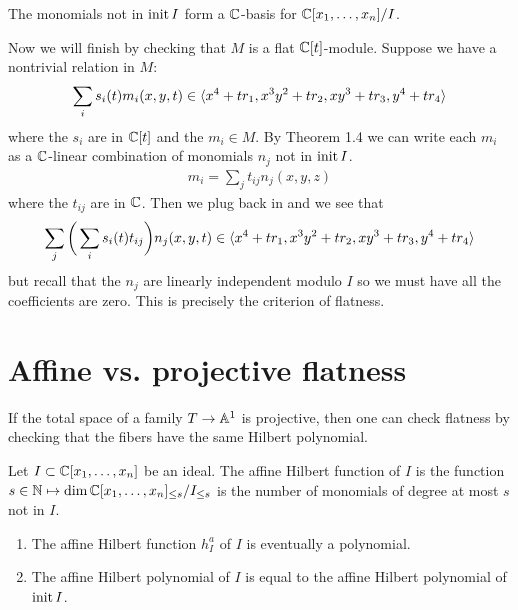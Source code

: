 \documentclass[12pt]{article}
\newcounter{problem}
\begin{document}

\begin{corollary}
	The monomials not in $\operatorname{init} I$ form a $\mathbb{C}$-basis for $\mathbb{C}[x_1,\dots,x_n]/I$.
\end{corollary}

Now we will finish by checking that $M$ is a flat $\mathbb{C}[t]$-module. Suppose we have a nontrivial
relation in $M$: \begin{align*}
	\sum_i s_i(t)m_i(x,y,t) \in \langle{x^4+tr_1,x^3y^2+tr_2,xy^3+tr_3,y^4+tr_4}\rangle
\end{align*} where the $s_i$ are in $\mathbb{C}[t]$ and the $m_i \in M$. By Theorem 1.4 we can
write each $m_i$ as a $\mathbb{C}$-linear combination of monomials $n_j$ not in $\operatorname{init} I$. \begin{align*}
	m_i = \sum_j t_{ij} n_j(x,y,z)
\end{align*} where the $t_{ij}$ are in $\mathbb{C}$. Then we plug back in and we see that \begin{align*}
	\sum_j  \bigg(\sum_i s_i(t) t_{ij}\bigg) n_j(x,y,t) \in \langle{x^4+tr_1,x^3y^2+tr_2,xy^3+tr_3,y^4+tr_4}\rangle
\end{align*} but recall that the $n_j$ are linearly independent modulo $I$ so we must have all the
coefficients are zero. This is precisely the criterion of flatness.

\section{Affine vs. projective flatness}

\begin{remark}
	If the total space of a family $T\to \mathbb{A}^1$ is projective, then
	one can check flatness by checking that the fibers have the same Hilbert polynomial.
\end{remark} 

\begin{definition}
	Let $I \subset \mathbb{C}[x_1,\ldots,x_n]$ be an ideal. The affine Hilbert function of $I$ is the function
	$s\in\mathbb{N}\mapsto \dim \mathbb{C}[x_1,\ldots,x_n]_{\leq s}/I_{\leq s}$ is the number of
	monomials of degree at most $s$ not in $I$.
\end{definition}

\begin{proposition}
	\begin{enumerate}
		\item The affine Hilbert function $h^a_I$ of $I$ is eventually a polynomial.
		\item The affine Hilbert polynomial of $I$ is equal to the affine Hilbert polynomial of $\operatorname{init} I$.
	\end{enumerate}
\end{proposition}
\end{document}
